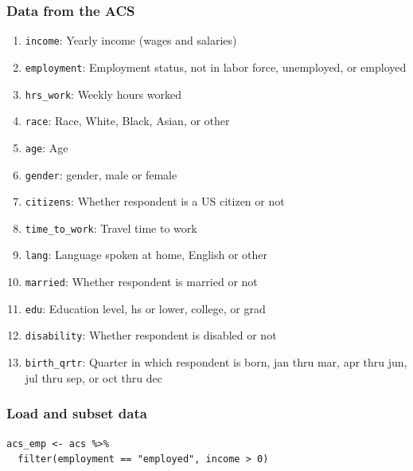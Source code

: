 \documentclass[slidestop,compress,mathserif,12pt,t,professionalfonts,xcolor=table]{beamer}
\begin{document}
\begin{frame}
\frametitle{Data from the ACS}

{\scriptsize
\begin{enumerate}
\item \texttt{income}: Yearly income (wages and salaries)
\item \texttt{employment}: Employment status, not in labor force, unemployed, or employed
\item \texttt{hrs\_work}: Weekly hours worked
\item \texttt{race}: Race, White, Black, Asian, or other
\item \texttt{age}: Age
\item \texttt{gender}: gender, male or female
\item \texttt{citizens}: Whether respondent is a US citizen or not
\item \texttt{time\_to\_work}: Travel time to work
\item \texttt{lang}: Language spoken at home, English or other
\item \texttt{married}: Whether respondent is married or not
\item \texttt{edu}: Education level, hs or lower, college, or grad
\item \texttt{disability}: Whether respondent is disabled or not
\item \texttt{birth\_qrtr}: Quarter in which respondent is born, jan thru mar, apr thru jun, jul thru sep, or oct thru dec 
\end{enumerate}
}

\end{frame}


\begin{frame}[fragile]
\frametitle{Load and subset data}

{\footnotesize
\begin{Verbatim}[frame=single, formatcom=\color{blue}]
acs_emp <- acs %>%
  filter(employment == "employed", income > 0)
\end{Verbatim}
}

\end{frame}

\end{document}
